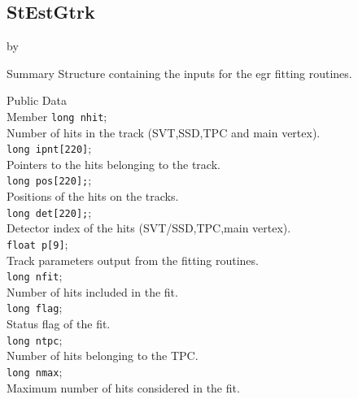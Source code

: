 \documentclass[twoside]{article}
\newcommand{\entrylabel}[1]{\mbox{\textbf{{#1}}}\hfil}%
\newenvironment{entry}
{\begin{list}{}%
    {\renewcommand{\makelabel}{\entrylabel}%
     \setlength{\labelwidth}{90pt}%
     \setlength{\leftmargin}{\labelwidth}
     \advance\leftmargin by \labelsep%
      }%
    }%
  {\end{list}}
\newcommand{\Entrylabel}[1]%
{\raisebox{0pt}[1ex][0pt]{\makebox[\labelwidth][l]%
    {\parbox[t]{\labelwidth}{\hspace{0pt}\textbf{{#1}}}}}}
\newenvironment{Entry}%
{\renewcommand{\entrylabel}{\Entrylabel}\begin{entry}}%
  {\end{entry}}
\begin{document}
\subsection{StEstGtrk}
\label{sec:StestGtrkq}
\begin{Entry}
\item[Summary]
Structure containing the inputs for the egr fitting routines.
\item[Public Data\\ Member]
\verb+long nhit+;\\
Number of hits in the track (SVT,SSD,TPC and main vertex).\\
\verb+long ipnt[220]+;\\
Pointers to the hits belonging to the track.\\
\verb+long pos[220];+;\\
Positions of the hits on the tracks.\\
\verb+long det[220];+;\\
Detector index of the hits (SVT/SSD,TPC,main vertex).\\
\verb+float p[9]+;\\ 
Track parameters output from the fitting routines.\\
\verb+long nfit+;\\
Number of hits included in the fit.\\
\verb+long flag+;\\
Status flag of the fit.\\
\verb+long ntpc+;\\
Number of hits belonging to the TPC.\\
\verb+long nmax+;\\
Maximum number of hits considered in the fit.\\
\end{Entry}
%
%
\end{document}
